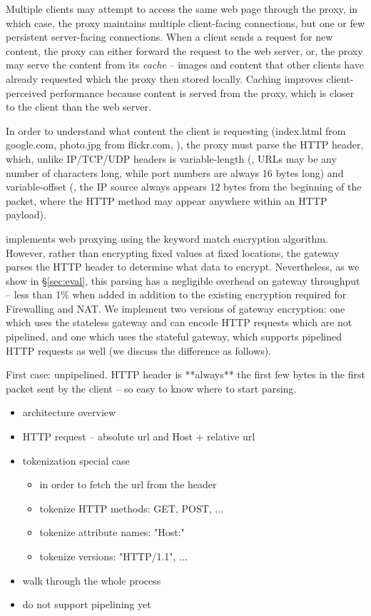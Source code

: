 Multiple clients may attempt to access the same web page through the proxy, in which case, the proxy maintains multiple client-facing connections, but one or few persistent server-facing connections.
When a client sends a request for new content, the proxy can either forward the request to the web server, or, the proxy may serve the content from its {\it cache} -- images and content that other clients have already requested which the proxy then stored locally. 
Caching improves client-perceived performance because content is served from the proxy, which is closer to the client than the web server.

In order to understand what content the client is requesting (index.html from google.com, photo.jpg from flickr.com, \etc{}), the proxy must parse the HTTP header, which, unlike IP/TCP/UDP headers is variable-length (\eg{}, URLs may be any number of characters long, while port numbers are always 16 bytes long) and variable-offset (\eg{}, the IP source always appears 12 bytes from the beginning of the packet, where the HTTP method may appear anywhere within an HTTP payload).

\sys implements web proxying using the keyword match encryption algorithm. 
However, rather than encrypting fixed values at fixed locations, the \sys gateway parses the HTTP header to determine what data to encrypt.
Nevertheless, as we show in \S\ref{sec:eval}, this parsing has a negligible overhead on gateway throughput -- less than 1\% when added in addition to the existing encryption required for Firewalling and NAT.
We implement two versions of gateway encryption: one which uses the stateless gateway and can encode HTTP requests which are not pipelined, and one which uses the stateful gateway, which supports pipelined HTTP requests as well (we discuss the difference as follows).

First case: unpipelined. HTTP header is **always** the first few bytes in the first packet sent by the client -- so easy to know where to start parsing.
\begin{itemize}
\item architecture overview
\item HTTP request -- absolute url and Host + relative url
\item tokenization special case \\
    \begin{itemize}
    \item in order to fetch the url from the header
    \item tokenize HTTP methods: GET, POST, ...
    \item tokenize attribute names: "Host:"
    \item tokenize versions: "HTTP/1.1", ...
    \end{itemize}
\item walk through the whole process
\item do not support pipelining yet
\end{itemize}

